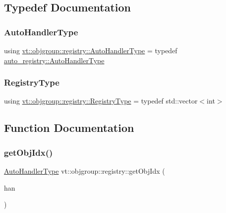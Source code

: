 \subsection{Typedef Documentation}
\mbox{\label{namespacevt_1_1objgroup_1_1registry_ab61bb18a54c83c090d49a1a7f6f30037}} 
\subsubsection{\texorpdfstring{Auto\+Handler\+Type}{AutoHandlerType}}
{\footnotesize\ttfamily using \hyperlink{namespacevt_1_1objgroup_1_1registry_ab61bb18a54c83c090d49a1a7f6f30037}{vt\+::objgroup\+::registry\+::\+Auto\+Handler\+Type} = typedef \hyperlink{namespacevt_1_1auto__registry_ae295e18699146815bb7d7674594d95d7}{auto\+\_\+registry\+::\+Auto\+Handler\+Type}}

\mbox{\label{namespacevt_1_1objgroup_1_1registry_abefb624bedde3ece3acdd759934ce541}} 
\subsubsection{\texorpdfstring{Registry\+Type}{RegistryType}}
{\footnotesize\ttfamily using \hyperlink{namespacevt_1_1objgroup_1_1registry_abefb624bedde3ece3acdd759934ce541}{vt\+::objgroup\+::registry\+::\+Registry\+Type} = typedef std\+::vector$<$int$>$}



\subsection{Function Documentation}
\mbox{\label{namespacevt_1_1objgroup_1_1registry_a07ab285a7f000924ed679c78e5004ff4}} 
\subsubsection{\texorpdfstring{get\+Obj\+Idx()}{getObjIdx()}}
{\footnotesize\ttfamily \hyperlink{namespacevt_1_1objgroup_1_1registry_ab61bb18a54c83c090d49a1a7f6f30037}{Auto\+Handler\+Type} vt\+::objgroup\+::registry\+::get\+Obj\+Idx (\begin{DoxyParamCaption}\item[{\hyperlink{namespacevt_1_1objgroup_1_1registry_ab61bb18a54c83c090d49a1a7f6f30037}{Auto\+Handler\+Type}}]{han }\end{DoxyParamCaption})\hspace{0.3cm}{\ttfamily [inline]}}

